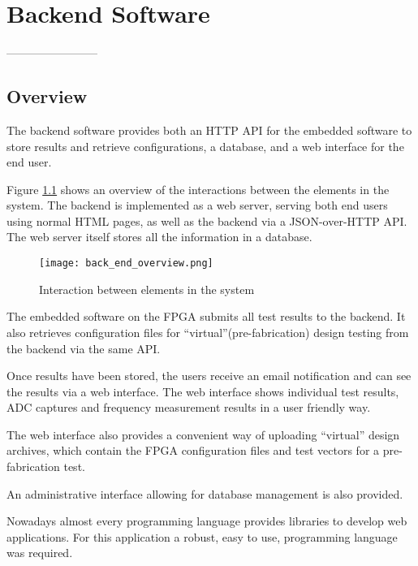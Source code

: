 \chapter{Backend Software}
------------------------

\section{Overview}
The backend software provides both an HTTP API for the embedded software to store results and
retrieve configurations, a database, and a web interface for the end user.

Figure \ref{fig:back_end_structure} shows an overview of the interactions between
the elements in the system. The backend is implemented as a web server, serving both
end users using normal HTML pages, as well as the backend via a JSON-over-HTTP API.
The web server itself stores all the information in a database.
\begin{figure}[htb]
\centering
\texttt{[image: back\_end\_overview.png]}
\caption{Interaction between elements in the system}
\label{fig:back_end_structure}
\end{figure}

The embedded software on the FPGA submits all test results to the backend. It also
retrieves configuration files for ``virtual''(pre-fabrication) design testing from the
backend via the same API.

Once results have been stored, the users receive an email notification and can
see the results via a web interface. The web interface shows individual test
results, ADC captures and frequency measurement results in a user friendly way.

The web interface also provides a convenient way of uploading ``virtual'' design
archives, which contain the FPGA configuration files and test vectors for a pre-fabrication
test.

An administrative interface allowing for database management is also provided.



 Nowadays almost every programming language provides libraries to develop web
applications. For this application a robust, easy to use, programming language was required.


